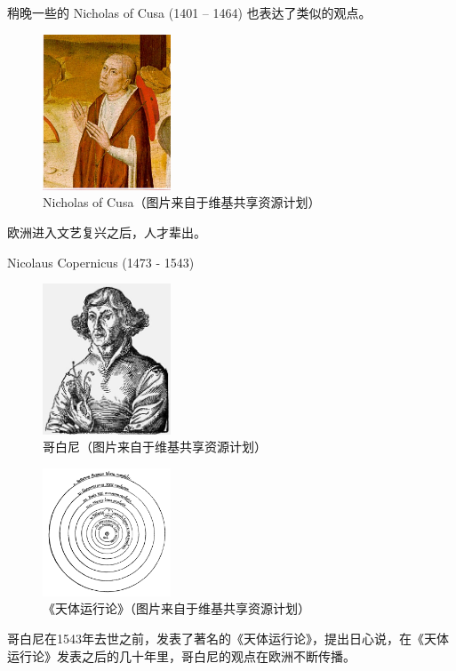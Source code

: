 \documentclass[a4paper,10.5pt]{book}
\begin{document}
稍晚一些的 Nicholas of Cusa  (1401 – 1464) 也表达了类似的观点。

\begin{figure}[ht]
\centering
\includegraphics[width=1.5in]{images/1_04-Nicholas_of_Cusa.jpg}
\caption{Nicholas of Cusa（图片来自于维基共享资源计划）}
\end{figure}

欧洲进入文艺复兴之后，人才辈出。

Nicolaus Copernicus (1473 - 1543)

\begin{figure}[ht]
\centering
\includegraphics[width=1.5in]{images/1_05-Mikolaj_Kopernik.jpg}
\caption{哥白尼（图片来自于维基共享资源计划）}
\end{figure}

\begin{figure}[ht]
\centering
\includegraphics[width=1.5in]{images/1_06-Copernican_heliocentrism_theory_diagram.png}
\caption{《天体运行论》（图片来自于维基共享资源计划）}
\end{figure}

哥白尼在1543年去世之前，发表了著名的《天体运行论》，提出日心说，在《天体运行论》发表之后的几十年里，哥白尼的观点在欧洲不断传播。
\end{document}
